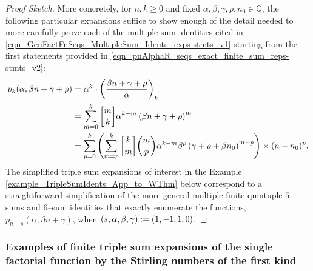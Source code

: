 \documentclass[12pt,reqno]{article}
\numberwithin{sfootnote}{section}
\numberwithin{equation}{section}
\theoremstyle{DefaultTheoremStyle}
\theoremstyle{definition}
\newcommand{\defequals}{\ensuremath{\vcentcolon=}}
\newcommand{\gkpSI}[2]{\ensuremath{\genfrac{\lbrack}{\rbrack}{0pt}{}{#1}{#2}}}
\newcommand{\Pochhammer}[2]{\ensuremath{\left(#1\right)_{#2}}}
\begin{document}
\begin{proof}[Proof Sketch] 
More concretely, 
for $n, k \geq 0$ and fixed 
$\alpha, \beta, \gamma, \rho, n_0 \in \mathbb{Q}$, the 
following particular expansions 
suffice to show enough of the detail needed to more carefully prove 
each of the multiple sum identities cited in 
\eqref{eqn_GenFactFnSeqs_MultipleSum_Idents_exps-stmts_v1} 
starting from the first statements provided in 
\eqref{eqn_pnAlphaR_seqs_exact_finite_sum_reps-stmts_v2}: 
\begin{align*} 
p_k(\alpha, \beta n + \gamma + \rho) 
     & = 
     \alpha^k \cdot \Pochhammer{\frac{\beta n + \gamma + \rho}{\alpha}}{k} \\ 
     & = 
     \sum_{m=0}^{k} \gkpSI{m}{k} \alpha^{k-m} 
     \left(\beta n + \gamma + \rho\right)^{m} \\ 
     & = 
     \sum_{p=0}^{k} \left( 
     \sum_{m=p}^{k} \gkpSI{k}{m} \binom{m}{p} \alpha^{k-m} \beta^{p} 
     \left(\gamma + \rho + \beta n_0\right)^{m-p} 
     \right) \times (n - n_0)^{p}. 
\end{align*} 
The simplified 
triple sum expansions of interest in the 
Example \ref{example_TripleSumIdents_App_to_WThm} below 
correspond to a straightforward 
simplification of the more general multiple finite quintuple $5$--sums and 
$6$--sum identities  
that exactly enumerate the functions, $p_{n-s}(\alpha, \beta n + \gamma)$, 
when $(s, \alpha, \beta, \gamma) \defequals (1, -1, 1, 0)$. 
\end{proof} 

\subsubsection{Examples of finite triple sum expansions of the 
               single factorial function by the 
               Stirling numbers of the first kind} 
\end{document}
